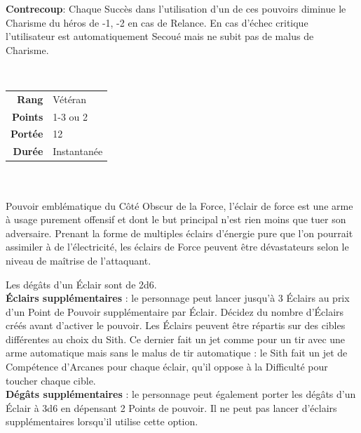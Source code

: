 \textbf{Contrecoup}: Chaque Succès dans l’utilisation d’un de ces pouvoirs diminue le Charisme du héros de -1, -2 en cas de Relance. En cas d’échec critique l’utilisateur est automatiquement Secoué mais ne subit pas de malus de Charisme.

\begin{description}[align=left] 

    \item [\’Eclairs de Force] ~ \\

        \begin{tabular}{ r l }
            \textbf{Rang}    & Vétéran \\
            \textbf{Points}  & 1-3 ou 2 \\
            \textbf{Portée}  & 12 \\
            \textbf{Durée}   & Instantanée \\
        \end{tabular}
        \\ \\
        Pouvoir emblématique du Côté Obscur de la Force, l’éclair de force est une arme à usage purement offensif et dont le but principal n’est rien moins que tuer son adversaire. Prenant la forme de multiples éclairs d’énergie pure que l’on pourrait assimiler à de l’électricité, les éclairs de Force peuvent être dévastateurs selon le niveau de maîtrise de l’attaquant. 

        Les dégâts d’un Éclair sont de 2d6. \\
        
        \textbf{Éclairs supplémentaires} : le personnage peut lancer jusqu’à 3 Éclairs au prix d’un Point de Pouvoir supplémentaire par Éclair. Décidez du nombre d’Éclairs créés avant d’activer le pouvoir. Les Éclairs peuvent être répartis sur des cibles différentes au choix du Sith. Ce dernier fait un jet comme pour un tir avec une arme automatique mais sans le malus de tir automatique : le Sith fait un jet de Compétence d’Arcanes pour chaque éclair, qu’il oppose à la Difficulté pour toucher chaque cible.\\
        
        \textbf{Dégâts supplémentaires} : le personnage peut également porter les dégâts d’un Éclair à 3d6 en dépensant 2 Points de pouvoir. Il ne peut pas lancer d’éclairs supplémentaires lorsqu’il utilise cette option.
        \\

    \item [\’Etranglement de Force] ~ \\


\end{description}
